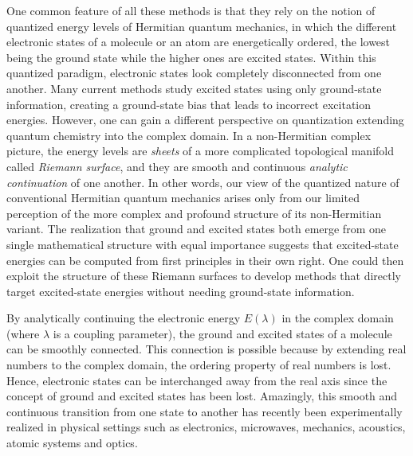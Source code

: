 \documentclass[aps,prb,reprint,noshowkeys,superscriptaddress]{revtex4-1}
\begin{document}
One common feature of all these methods is that they rely on the notion of quantized energy levels of Hermitian quantum mechanics, in which the different electronic states of a molecule or an atom are energetically ordered, the lowest being the ground state while the higher ones are excited states. 
Within this quantized paradigm, electronic states look completely disconnected from one another.
Many current methods study excited states using only ground-state information, creating a ground-state bias that leads to incorrect excitation energies.
However, one can gain a different perspective on quantization extending quantum chemistry into the complex domain.
In a non-Hermitian complex picture, the energy levels are \textit{sheets} of a more complicated topological manifold called \textit{Riemann surface}, and they are smooth and continuous \textit{analytic continuation} of one another. 
In other words, our view of the quantized nature of conventional Hermitian quantum mechanics arises only from our limited perception of the more complex and profound structure of its non-Hermitian variant. \cite{MoiseyevBook,BenderPTBook}
The realization that ground and excited states both emerge from one single mathematical structure with equal importance suggests that excited-state energies can be computed from first principles in their own right. 
One could then exploit the structure of these Riemann surfaces to develop methods that directly target excited-state energies without needing ground-state information. \cite{Burton_2019,Burton_2019a}

By analytically continuing the electronic energy $E(\lambda)$ in the complex domain (where $\lambda$ is a coupling parameter), the ground and excited states of a molecule can be smoothly connected.
This connection is possible because by extending real numbers to the complex domain, the ordering property of real numbers is lost.
Hence, electronic states can be interchanged away from the real axis since the concept of ground and excited states has been lost.
Amazingly, this smooth and continuous transition from one state to another has recently been experimentally realized in physical settings such as electronics, microwaves, mechanics, acoustics, atomic systems and optics. \cite{Bittner_2012,Chong_2011,Chtchelkatchev_2012,Doppler_2016,Guo_2009,Hang_2013,Liertzer_2012,Longhi_2010,Peng_2014, Peng_2014a,Regensburger_2012,Ruter_2010,Schindler_2011,Szameit_2011,Zhao_2010,Zheng_2013,Choi_2018,El-Ganainy_2018}
\end{document}
